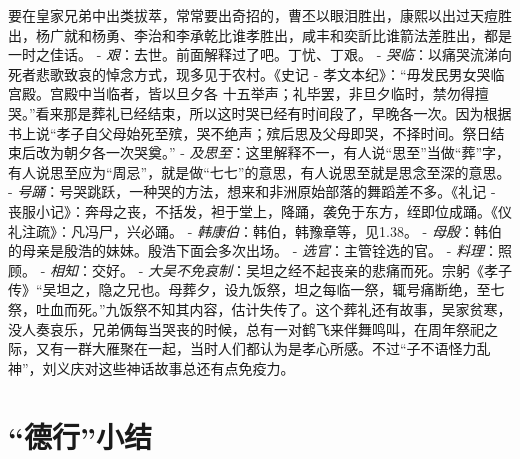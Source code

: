 \documentclass[]{book}
\begin{document}
要在皇家兄弟中出类拔萃，常常要出奇招的，曹丕以眼泪胜出，康熙以出过天痘胜出，杨广就和杨勇、李治和李承乾比谁孝胜出，咸丰和奕訢比谁箭法差胜出，都是一时之佳话。
- \emph{艰}：去世。前面解释过了吧。丁忧、丁艰。 -
\emph{哭临}：以痛哭流涕向死者悲歌致哀的悼念方式，现多见于农村。《史记 -
孝文本纪》：``毋发民男女哭临宫殿。宫殿中当临者，皆以旦夕各
十五举声；礼毕罢，非旦夕临时，禁勿得擅哭。''看来那是葬礼已经结束，所以这时哭已经有时间段了，早晚各一次。因为根据书上说``孝子自父母始死至殡，哭不绝声；殡后思及父母即哭，不择时间。祭日结束后改为朝夕各一次哭奠。''
-
\emph{及思至}：这里解释不一，有人说``思至''当做``葬''字，有人说思至应为``周忌''，就是做``七七''的意思，有人说思至就是思念至深的意思。
-
\emph{号踊}：号哭跳跃，一种哭的方法，想来和非洲原始部落的舞蹈差不多。《礼记
-
丧服小记》：奔母之丧，不括发，袒于堂上，降踊，袭免于东方，绖即位成踊。《仪礼注疏》：凡冯尸，兴必踊。
- \emph{韩康伯}：韩伯，韩豫章等，见1.38。 -
\emph{母殷}：韩伯的母亲是殷浩的妹妹。殷浩下面会多次出场。 -
\emph{选官}：主管铨选的官。 - \emph{料理}：照顾。 - \emph{相知}：交好。
-
\emph{大吴不免哀制}：吴坦之经不起丧亲的悲痛而死。宗躬《孝子传》``吴坦之，隐之兄也。母葬夕，设九饭祭，坦之每临一祭，辄号痛断绝，至七祭，吐血而死。''九饭祭不知其内容，估计失传了。这个葬礼还有故事，吴家贫寒，没人奏哀乐，兄弟俩每当哭丧的时候，总有一对鹤飞来伴舞鸣叫，在周年祭祀之际，又有一群大雁聚在一起，当时人们都认为是孝心所感。不过``子不语怪力乱神''，刘义庆对这些神话故事总还有点免疫力。

\section{\texorpdfstring{``德行''小结}{德行小结}}
\end{document}

